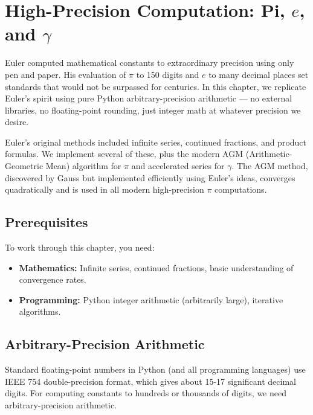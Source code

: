 
\chapter{High-Precision Computation: Pi, $e$, and $\gamma$}

\begin{historical}
Euler computed mathematical constants to extraordinary precision using only pen and paper.
His evaluation of $\pi$ to 150 digits and $e$ to many decimal places set standards that
would not be surpassed for centuries. In this chapter, we replicate Euler's spirit using
pure Python arbitrary-precision arithmetic --- no external libraries, no floating-point
rounding, just integer math at whatever precision we desire.

Euler's original methods included infinite series, continued fractions, and product formulas.
We implement several of these, plus the modern AGM (Arithmetic-Geometric Mean) algorithm
for $\pi$ and accelerated series for $\gamma$. The AGM method, discovered by Gauss but
implemented efficiently using Euler's ideas, converges quadratically and is used in
all modern high-precision $\pi$ computations.
\end{historical}

\section{Prerequisites}

To work through this chapter, you need:
\begin{itemize}
    \item \textbf{Mathematics:} Infinite series, continued fractions, basic understanding of convergence rates.
    \item \textbf{Programming:} Python integer arithmetic (arbitrarily large), iterative algorithms.
\end{itemize}

\section{Arbitrary-Precision Arithmetic}

Standard floating-point numbers in Python (and all programming languages) use IEEE 754
double-precision format, which gives about 15-17 significant decimal digits. For computing
constants to hundreds or thousands of digits, we need arbitrary-precision arithmetic.

